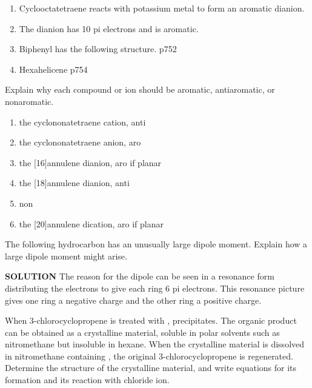 \begin{enumerate}
    \item Cyclooctatetraene reacts with potassium metal to form an aromatic dianion.
    \item The dianion has 10 pi electrons and is aromatic.
    \item Biphenyl has the following structure. p752
    \item Hexahelicene p754
\end{enumerate}

\begin{example} %
    Explain why each compound or ion should be aromatic, antiaromatic, or nonaromatic.
    \begin{enumerate}
        \item the cyclononatetraene cation, anti
        \item the cyclononatetraene anion, aro
        \item the [16]annulene dianion, aro if planar
        \item the [18]annulene dianion, anti
        \item non
        \item the [20]annulene dication, aro if planar
    \end{enumerate}
\end{example}

\begin{example} %
    The following hydrocarbon has an unusually large dipole moment. Explain how a large dipole moment might arise.

    \noindent \textbf{SOLUTION} \quad The reason for the dipole can be seen in a resonance form distributing the electrons to give each ring 6 pi electrons. This resonance picture gives one ring a negative charge and the other ring a positive charge.
\end{example}

\begin{example} %
    When 3-chlorocyclopropene is treated with ,  precipitates. The organic product can be obtained as a crystalline material, soluble in polar solvents such as nitromethane but insoluble in hexane. When the crystalline material is dissolved in nitromethane containing , the original 3-chlorocyclopropene is regenerated. Determine the structure of the crystalline material, and write equations for its formation and its reaction with chloride ion.
\end{example}

